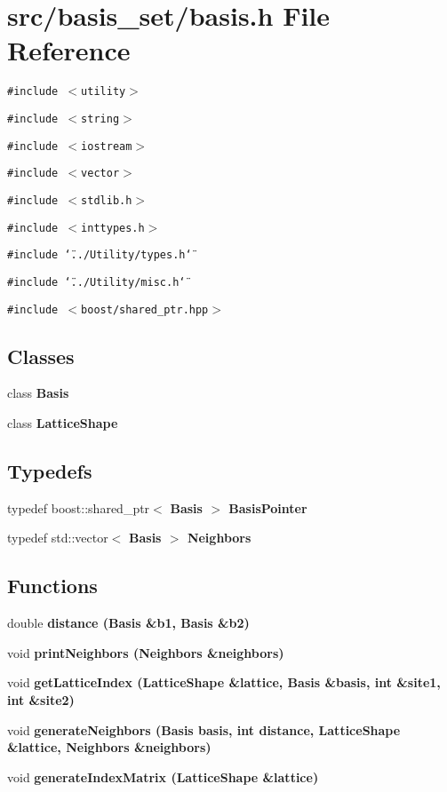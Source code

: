 \section{src/basis\_\-set/basis.h File Reference}
\label{basis_8h}
{\tt \#include $<$utility$>$}\par
{\tt \#include $<$string$>$}\par
{\tt \#include $<$iostream$>$}\par
{\tt \#include $<$vector$>$}\par
{\tt \#include $<$stdlib.h$>$}\par
{\tt \#include $<$inttypes.h$>$}\par
{\tt \#include \char`\"{}../Utility/types.h\char`\"{}}\par
{\tt \#include \char`\"{}../Utility/misc.h\char`\"{}}\par
{\tt \#include $<$boost/shared\_\-ptr.hpp$>$}\par
\subsection*{Classes}
\begin{CompactItemize}
\item 
class \bf{Basis}
\item 
class \bf{Lattice\-Shape}
\end{CompactItemize}
\subsection*{Typedefs}
\begin{CompactItemize}
\item 
typedef boost::shared\_\-ptr$<$ \bf{Basis} $>$ \bf{Basis\-Pointer}
\item 
typedef std::vector$<$ \bf{Basis} $>$ \bf{Neighbors}
\end{CompactItemize}
\subsection*{Functions}
\begin{CompactItemize}
\item 
double \bf{distance} (\bf{Basis} \&b1, \bf{Basis} \&b2)
\item 
void \bf{print\-Neighbors} (\bf{Neighbors} \&neighbors)
\item 
void \bf{get\-Lattice\-Index} (\bf{Lattice\-Shape} \&lattice, \bf{Basis} \&basis, int \&site1, int \&site2)
\item 
void \bf{generate\-Neighbors} (\bf{Basis} basis, int distance, \bf{Lattice\-Shape} \&lattice, \bf{Neighbors} \&neighbors)
\item 
void \bf{generate\-Index\-Matrix} (\bf{Lattice\-Shape} \&lattice)
\end{CompactItemize}
